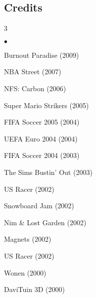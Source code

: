 \documentclass[margin,line]{resume}
\newenvironment{list2}{
  \begin{list}{$\bullet$}{%
      \setlength{\itemsep}{0in}
      \setlength{\parsep}{0in} \setlength{\parskip}{0in}
      \setlength{\topsep}{0in} \setlength{\partopsep}{0in}
      \setlength{\leftmargin}{0.2in}}}{\end{list}}
\begin{document}
\begin{resume}
\section{\sc Credits}
\begin{multicols}{3}
\begin{list2}
    \item Burnout Paradise (2009)
    \item NBA Street (2007)
    \item NFS: Carbon (2006)    
    \item Super Mario Strikers (2005)
    \item FIFA Soccer 2005 (2004)
    \item UEFA Euro 2004 (2004)
    \item FIFA Soccer 2004 (2003)
    \item The Sims Bustin' Out (2003)
    \item US Racer (2002)
    \item Snowboard Jam (2002)
    \item Nim \& Lost Garden (2002)
    \item Magnets (2002)
    \item US Racer (2002)
    \item Wonen (2000)
    \item DaviTuin 3D (2000)    
\end{list2}
\end{multicols}

\end{resume}
\end{document}
